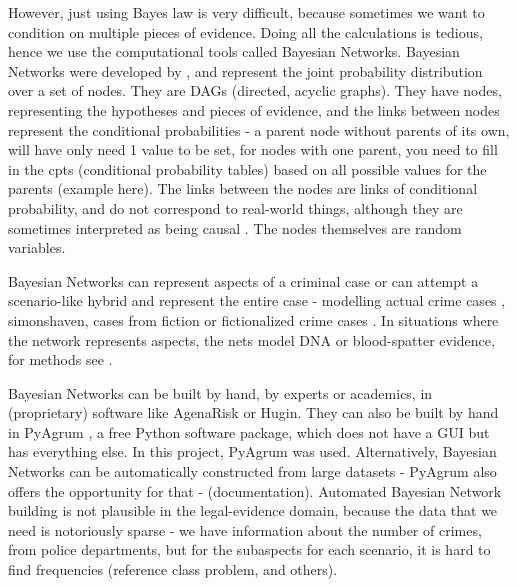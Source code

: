 However, just using Bayes law is very difficult, because sometimes we want to condition on multiple pieces of evidence. Doing all the calculations is tedious, hence we use the computational tools called Bayesian Networks. Bayesian Networks were developed by \citet{pearl1988}, and represent the joint probability distribution over a set of nodes. They are DAGs (directed, acyclic graphs). They have nodes, representing the hypotheses and pieces of evidence, and the links between nodes represent the conditional probabilities - a parent node without parents of its own, will have only need 1 value to be set, for nodes with one parent, you need to fill in the cpts (conditional probability tables) based on all possible values for the parents (example here). The links between the nodes are links of conditional probability, and do not correspond to real-world things, although they are sometimes interpreted as being causal \citep{Dawid2008}. The nodes themselves are random variables.

Bayesian Networks can represent aspects of a criminal case or can attempt a scenario-like hybrid and represent the entire case - modelling actual crime cases \citep{Kadane1996},  simonshaven, cases from fiction \citep{Fenton2012} or fictionalized crime cases \citep{vanLeeuwen2019}. In situations where the network represents aspects, the nets model DNA or blood-spatter evidence, for methods see \citep{Meester2021}. 

Bayesian Networks can be built by hand, by experts or academics, in (proprietary) software like AgenaRisk or Hugin. They can also be built by hand in PyAgrum \citep{pyagrum2020}, a free Python software package, which does not have a GUI but has everything else. In this project, PyAgrum was used. Alternatively, Bayesian Networks can be automatically constructed from large datasets - PyAgrum also offers the opportunity for that - (documentation). Automated Bayesian Network building is not plausible in the legal-evidence domain, because the data that we need is notoriously sparse - we have information about the number of crimes, from police departments, but for the subaspects for each scenario, it is hard to find frequencies (reference class problem, and others). 



